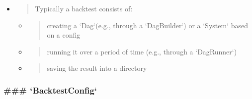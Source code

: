 \documentclass[11pt, reqno]{amsart}
\begin{document}
\begin{itemize}
\item
  \begin{quote}
  Typically a backtest consists of:
  \end{quote}

  \begin{itemize}
  \item
    \begin{quote}
    creating a `Dag`(e.g., through a `DagBuilder`) or a `System` based
    on a config
    \end{quote}
  \item
    \begin{quote}
    running it over a period of time (e.g., through a `DagRunner`)
    \end{quote}
  \item
    \begin{quote}
    saving the result into a directory
    \end{quote}
  \end{itemize}
\end{itemize}

\hypertarget{backtestconfig}{%
\subsubsection{\texorpdfstring{\textbf{\#\#\#
`BacktestConfig`}}{\#\#\# `BacktestConfig`}}\label{backtestconfig}}
\end{document}

